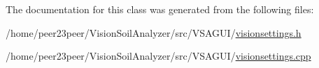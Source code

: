 The documentation for this class was generated from the following files\+:\begin{DoxyCompactItemize}
\item 
/home/peer23peer/\+Vision\+Soil\+Analyzer/src/\+V\+S\+A\+G\+U\+I/\hyperlink{visionsettings_8h}{visionsettings.\+h}\item 
/home/peer23peer/\+Vision\+Soil\+Analyzer/src/\+V\+S\+A\+G\+U\+I/\hyperlink{visionsettings_8cpp}{visionsettings.\+cpp}\end{DoxyCompactItemize}
